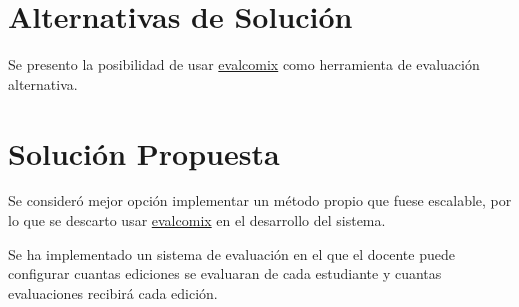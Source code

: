\section{Alternativas de Solución}
Se presento la posibilidad de usar \href{http://evalcomix.uca.es/}{evalcomix} \cite{Evalcomix} como herramienta de evaluación alternativa.

\section{Solución Propuesta}
Se consideró mejor opción implementar un método propio que fuese escalable, por lo que se descarto usar \href{http://evalcomix.uca.es/}{evalcomix} \cite{Evalcomix} en el desarrollo del sistema.
\newline

Se ha implementado un sistema de evaluación en el que el docente puede configurar cuantas ediciones se evaluaran de cada estudiante y cuantas evaluaciones recibirá cada edición.